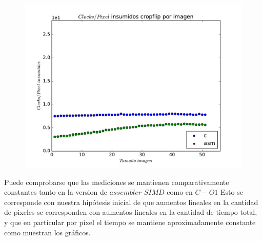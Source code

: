\begin{figure}
  \begin{center}
	\includegraphics[scale=0.5]{cropflipall.pdf}
  \end{center}
\end{figure}

Puede comprobarse que las mediciones se mantienen comparativamente constantes tanto en la version de $assembler$ $SIMD$ como en $C-O1$
Esto se corresponde con nuestra hipótesis inicial de que aumentos lineales en la cantidad de pixeles se corresponden con aumentos lineales en la cantidad de tiempo total, y que en particular por pixel el tiempo se mantiene aproximadamente constante como muestran los gráficos.



